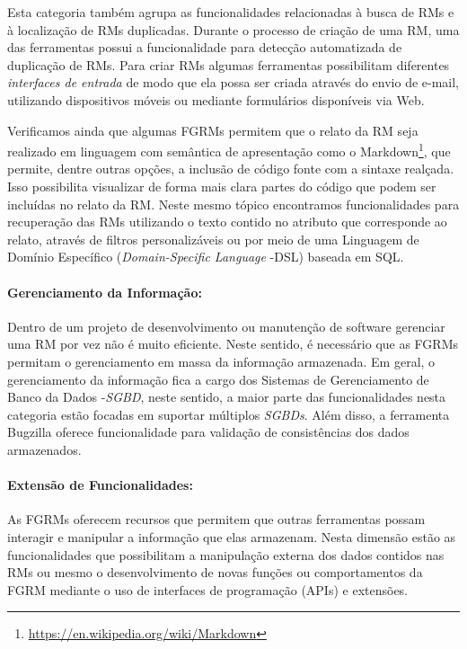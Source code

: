 Esta categoria também agrupa as funcionalidades relacionadas à busca de RMs e à
localização de RMs duplicadas. Durante o processo de criação de uma RM, uma das
ferramentas possui a funcionalidade para detecção automatizada de duplicação de
RMs. Para criar RMs algumas ferramentas possibilitam diferentes
\textit{interfaces de entrada} de modo que ela possa ser criada através do
envio de e-mail, utilizando dispositivos móveis ou mediante formulários
disponíveis via Web\@.

Verificamos ainda que algumas FGRMs permitem que o relato da RM seja realizado
em linguagem com semântica de apresentação como o
Markdown\footnote{\url{https://en.wikipedia.org/wiki/Markdown}}, que permite,
dentre outras opções, a inclusão de código fonte com a sintaxe realçada. Isso
possibilita visualizar de forma mais clara partes do código que podem ser
incluídas no relato da RM\@. Neste mesmo tópico encontramos funcionalidades
para recuperação das RMs utilizando o texto contido no atributo que corresponde
ao relato, através de filtros personalizáveis ou por meio de uma Linguagem de
Domínio Específico (\textit{Domain-Specific Language} \@-\@ DSL) baseada em
SQL\@.

\paragraph{Gerenciamento da Informação:}
\label{par:gerenciamento_da_informação}

Dentro de um projeto de desenvolvimento ou manutenção de software gerenciar uma
RM por vez não é muito eficiente. Neste sentido, é necessário que as FGRMs
permitam o gerenciamento em massa da informação armazenada. Em geral, o
gerenciamento da informação fica a cargo dos Sistemas de Gerenciamento de Banco
da Dados \@-\@ \textit{SGBD}, neste sentido, a maior parte das funcionalidades
nesta categoria estão focadas em suportar múltiplos \textit{SGBDs}. Além disso,
a ferramenta Bugzilla oferece funcionalidade para validação de consistências
dos dados armazenados.

\paragraph{Extensão de Funcionalidades:}
\label{par:extensão_de_funcionalidades}

As FGRMs oferecem recursos que permitem que outras ferramentas possam interagir
e manipular a informação que elas armazenam. Nesta dimensão estão as
funcionalidades que possibilitam a manipulação externa dos dados contidos nas
RMs ou mesmo o desenvolvimento de novas funções ou comportamentos da FGRM
mediante o uso de interfaces de programação (APIs) e extensões.

